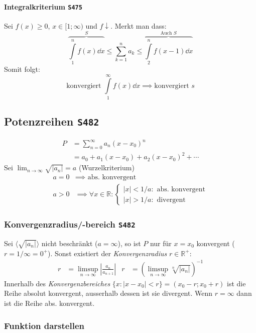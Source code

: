 \documentclass[margin=small, twocolumn]{hsrzf}
\numberwithin{equation}{subsection}
\newcommand{\brpage}[1]{\textcolor{red!70!black}{\small\texttt{S#1}}}
\begin{document}
\paragraph{Integralkriterium \brpage{475}}
Sei \(f(x) \geq 0\), \(x \in [1;\infty)\) und \(f\downarrow\). Merkt man dass:
\[
    \overbrace{\int\limits_1^n f(x) \dd{x}}^{S} 
    \leq \sum_{k=1}^n a_k
    \leq \overbrace{\int\limits_2^n f(x-1) \dd{x}}^{\text{Auch } S}
\]
Somit folgt:
\[
    \text{konvergiert } \int\limits_1^\infty f(x) \dd{x}
    \implies \text{konvergiert } s
\]

\subsection{Potenzreihen \brpage{482}} \label{sec:powerseries}
\begin{align*}
    P &= \sum_{n=0}^\infty a_n (x - x_0)^n \\
      &= a_0 + a_1 (x - x_0) + a_2 (x - x_0)^2 + \cdots
\end{align*}
Sei \(\lim_{n\to\infty} \sqrt{|a_n|} = a \) (Wurzelkriterium)
\begin{align*}
    a = 0 &\implies \text{ abs. konvergent} \\
    a > 0 &\implies
    \forall x \in \mathbb{R}:
    \begin{cases}
        |x| < 1/a: \text{ abs. konvergent} \\
        |x| > 1/a: \text{ divergent}
    \end{cases}
\end{align*}

\subsubsection{Konvergenzradius/-bereich \brpage{482}}
Sei \(\langle \sqrt{|a_n|}\rangle\) nicht beschr\"ankt (\(a = \infty\)), so ist \(P\) nur f\"ur \(x=x_0\) konvergent (\(r = 1/\infty = 0^+\)). Sonst existiert der \emph{Konvergenzradius} \(r \in\mathbb{R}^+\):
\begin{align*}
    r &= \limsup_{n\to\infty} \left| \frac{a_n}{a_{n+1}} \right| &
    r &= \left( \limsup_{n\to\infty} \sqrt[n]{| a_n |} \right)^{-1}
\end{align*}
Innerhalb des \emph{Konvergenzbereiches} \(\{ x : |x - x_0| < r\} = (x_0-r; x_0+r)\) ist die Reihe absolut konvergent, ausserhalb dessen ist sie divergent.
Wenn \(r = \infty\) dann ist die Reihe abs. konvergent.

\subsubsection{Funktion darstellen}
\end{document}
